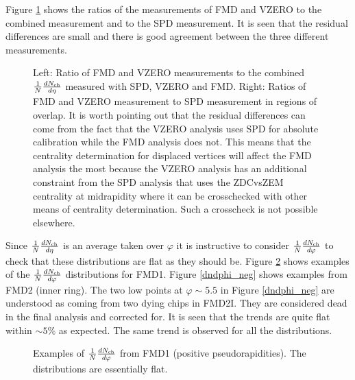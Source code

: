 \documentclass[11pt]{article}
\begin{document}
Figure \ref{ratiofmdvzero} shows the ratios of the measurements of FMD
and VZERO to the combined measurement and to the SPD measurement. It
is seen that the residual differences are small and there is good
agreement between the three different measurements.
\begin{figure}
  \centering
  \begin{minipage}{0.5\linewidth}
    \centering
  \end{minipage}%
  \begin{minipage}{0.5\linewidth}
    \centering
  \end{minipage}%
  \caption{Left: Ratio of FMD and VZERO measurements to the combined
    $\dndeta$ measured with SPD, VZERO and FMD. Right: Ratios of FMD
    and VZERO measurement to SPD measurement in regions of
    overlap. It is worth pointing out that the residual differences
    can come from the fact that the VZERO analysis uses SPD for
    absolute calibration while the FMD analysis does not. This means that the
    centrality determination for displaced vertices will affect the
    FMD analysis the most because the VZERO analysis has an additional
  constraint from the SPD analysis that uses the ZDCvsZEM centrality
  at midrapidity where it can be crosschecked with other means of
  centrality determination. Such a crosscheck is not possible elsewhere.}
  \label{ratiofmdvzero}
\end{figure} 

Since $\dndeta$ is an average taken over $\varphi$ it is instructive
to consider $\dndphi$ to check that these distributions are flat as
they should be. Figure \ref{dndphi_pos} shows examples of the
$\dndphi$ distributions for FMD1. Figure \ref{dndphi_neg} shows
examples from FMD2 (inner ring). The two low points at $\varphi \sim
5.5$ in Figure \ref{dndphi_neg} are understood as coming from two
dying chips in FMD2I. They are considered dead in the final analysis
and corrected for. It is seen that the trends are quite flat within
$\sim 5\%$ as expected. The same trend is observed for all the
distributions.

\begin{figure}
  \centering
  \caption{Examples of $\dndphi$ from FMD1 (positive
    pseudorapidities). The distributions are essentially flat.}
  \label{dndphi_pos}
\end{figure} 
\end{document}
